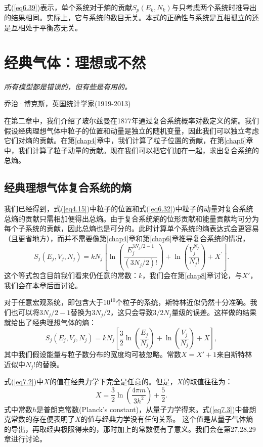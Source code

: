 \documentclass[UTF8]{ctexart}
\numberwithin{equation}{section}%
\numberwithin{figure}{section}%
\begin{document}
    式(\ref{eq6.39})表示，单个系统对于熵的贡献$S_p(E_k,N_k)$与只考虑两个系统时推导出的结果相同。实际上，它与系统的数目无关。本式的正确性与系统是互相孤立的还是互相处于平衡态无关。
    \clearpage
    \section{经典气体：理想或不然}\label{chap7}

    \centerline{\textit{所有模型都是错误的，但有些是有用的。}}
    \centerline{乔治·博克斯，英国统计学家(1919-2013)}

    在第二章中，我们介绍了玻尔兹曼在1877年通过复合系统概率对数定义的熵。我们假设经典理想气体中粒子的位置和动量是独立的随机变量，因此我们可以独立考虑它们对熵的贡献。在第\ref{chap4}章中，我们计算了粒子位置的贡献，在第\ref{chap6}章中，我们计算了粒子动量的贡献。现在我们可以把它们加在一起，求出复合系统的总熵。
    \subsection{经典理想气体复合系统的熵}

    我们已经得到，式(\ref{eq4.15})中粒子的位置和式(\ref{eq6.32})中粒子的动量对复合系统总熵的贡献只需相加便得出总熵。由于复合系统熵的位形贡献和能量贡献均可分为每个子系统的贡献，因此总熵也是可分的。此时计算单个系统的熵表达式会更容易（且更省地方），而并不需要像第\ref{chap4}章和第\ref{chap6}章推导复合系统的情况，
    \begin{equation}
        S_{j}\left(E_{j}, V_{j}, N_{j}\right)=k N_{j}\left[\ln \left(\frac{E_{j}^{3 N_{j} / 2-1}}{\left(3 N_{j} / 2\right) !}\right)+\ln \left(\frac{V_{j}^{N_{j}}}{N_{j} !}\right)+X^{\prime}\right] .
    \end{equation}
    这个等式包含目前我们看来仍任意的常数：$k$，我们会在第\ref{chap8}章讨论，与$X'$，我们会在本章后面讨论。

    对于任意宏观系统，即包含大于$10^{10}$个粒子的系统，斯特林近似仍然十分准确。我们也可以将$3N_j/2-1$替换为$3N_j/2$，这只会导致$3/2N_j$量级的误差。这样做的结果就给出了经典理想气体的熵：
    \begin{equation}\label{eq7.2}
        S_{j}\left(E_{j}, V_{j}, N_{j}\right)=k N_{j}\left[\frac{3}{2} \ln \left(\frac{E_{j}}{N_{j}}\right)+\ln \left(\frac{V_{j}}{N_{j}}\right)+X\right],
    \end{equation}
    其中我们假设能量与粒子数分布的宽度均可被忽略。常数$X=X'+1$来自斯特林近似中$N_j!$的替换。

    式(\ref{eq7.2})中$X$的值在经典力学下完全是任意的。但是，$X$的取值往往为：
    \begin{equation}\label{eq7.3}
        X=\frac{3}{2} \ln \left(\frac{4 \pi m}{3 h^{2}}\right)+\frac{5}{2} .
    \end{equation}
    式中常数$h$是普朗克常数(Planck's constant)，从量子力学得来。式(\ref{eq7.3})中普朗克常数的存在便表明了$X$的值与经典力学没有任何关系。
    这个值是从量子气体熵的导出，再取经典极限得来的，那时加上的常数便有了意义。我们会在第27,28,29章进行讨论。
\end{document}

